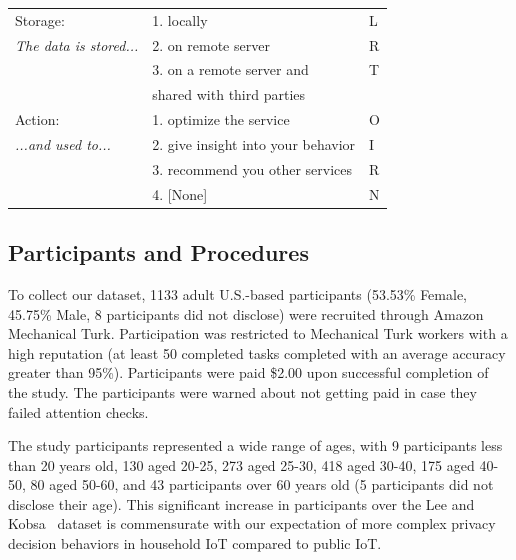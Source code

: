 \begin{table}
\begin{tabular} {l|l|l}
		Storage:  & 1. locally	& L\\
		\emph{The data is stored...} & 2. on remote server & R						\\
		& 3. on a remote server and & T\\
		& shared with third parties &\\\hline
		Action: & 1. optimize the service & O \\
		\emph{...and used to... } & 2. give insight into your behavior& I \\
		& 3. recommend you other services & R\\
		& 4. [None] & N\\ \hline
	\end{tabular}
\end{table}

\subsection{Participants and Procedures}
To collect our dataset, 1133 adult U.S.-based participants (53.53\% Female, 45.75\% Male, 8 participants did not disclose) were recruited through Amazon Mechanical Turk. Participation was restricted to Mechanical Turk workers with a high reputation (at least 50 completed tasks completed with an average accuracy greater than 95\%). Participants were paid \$2.00 upon successful completion of the study. The participants were warned about not getting paid in case they failed attention checks.

The study participants represented a wide range of ages, with 9 participants less than 20 years old, 130 aged 20-25, 273 aged 25-30, 418 aged 30-40, 175 aged 40-50, 80 aged 50-60, and 43 participants over 60 years old (5 participants did not disclose their age). This significant increase in participants over the Lee and Kobsa~\cite{lee2016understanding} dataset is commensurate with our expectation of more complex privacy decision behaviors in household IoT compared to public IoT.

